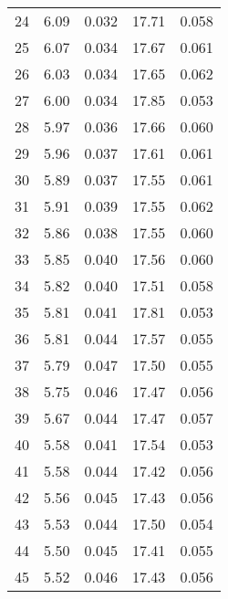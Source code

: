 \begin{table}
\begin{tabular}{c|ll|ll}
24 & 6.09 & 0.032 & 17.71 & 0.058 \\
25 & 6.07 & 0.034 & 17.67 & 0.061 \\
26 & 6.03 & 0.034 & 17.65 & 0.062 \\
27 & 6.00 & 0.034 & 17.85 & 0.053 \\
28 & 5.97 & 0.036 & 17.66 & 0.060 \\
29 & 5.96 & 0.037 & 17.61 & 0.061 \\
30 & 5.89 & 0.037 & 17.55 & 0.061 \\
31 & 5.91 & 0.039 & 17.55 & 0.062 \\
32 & 5.86 & 0.038 & 17.55 & 0.060 \\
33 & 5.85 & 0.040 & 17.56 & 0.060 \\
34 & 5.82 & 0.040 & 17.51 & 0.058 \\
35 & 5.81 & 0.041 & 17.81 & 0.053 \\
36 & 5.81 & 0.044 & 17.57 & 0.055 \\
37 & 5.79 & 0.047 & 17.50 & 0.055 \\
38 & 5.75 & 0.046 & 17.47 & 0.056 \\
39 & 5.67 & 0.044 & 17.47 & 0.057 \\
40 & 5.58 & 0.041 & 17.54 & 0.053 \\
41 & 5.58 & 0.044 & 17.42 & 0.056 \\
42 & 5.56 & 0.045 & 17.43 & 0.056 \\
43 & 5.53 & 0.044 & 17.50 & 0.054 \\
44 & 5.50 & 0.045 & 17.41 & 0.055 \\
45 & 5.52 & 0.046 & 17.43 & 0.056 \\
               \hline
        \end{tabular}
    \end{table}
    \clearpage

